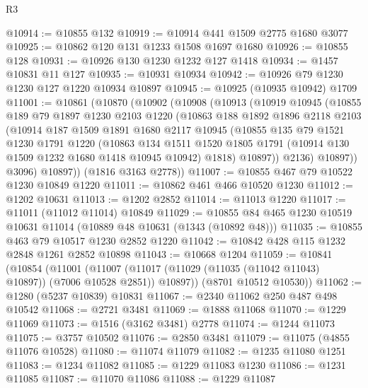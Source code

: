 \begin{lexlean}{R3}
\begin{coremodule}
@10914 := @10855 @132
@10919 := @10914 @441 @1509 @2775 @1680 @3077
@10925 := @10862 @120 @131 @1233 @1508 @1697 @1680
@10926 := @10855 @128
@10931 := @10926 @130 @1230 @1232 @127 @1418
@10934 := @1457 @10831 @11 @127
@10935 := @10931 @10934
@10942 := @10926 @79 @1230 @1230 @127 @1220 @10934 @10897
@10945 := @10925 (@10935 @10942) @1709
@11001 := @10861
    (@10870
      (@10902
        (@10908
          (@10913
            (@10919
              @10945
              (@10855
                @189
                @79
                @1897
                @1230
                @2103
                @1220
                (@10863
                  @188
                  @1892
                  @1896
                  @2118
                  @2103
                  (@10914
                    @187
                    @1509
                    @1891
                    @1680
                    @2117
                    @10945
                    (@10855
                      @135
                      @79
                      @1521
                      @1230
                      @1791
                      @1220
                      (@10863
                        @134
                        @1511
                        @1520
                        @1805
                        @1791
                        (@10914 @130 @1509 @1232 @1680 @1418 @10945 @10942)
                        @1818)
                      @10897))
                  @2136)
                @10897))
            @3096)
          @10897))
      (@1816 @3163 @2778))
@11007 := @10855 @467 @79 @10522 @1230 @10849 @1220
@11011 := @10862 @461 @466 @10520 @1230
@11012 := @1202 @10631
@11013 := @1202 @2852
@11014 := @11013 @1220
@11017 := @11011 (@11012 @11014) @10849
@11029 := @10855 @84 @465 @1230 @10519 @10631 @11014 (@10889 @48 @10631 (@1343 (@10892 @48)))
@11035 := @10855 @463 @79 @10517 @1230 @2852 @1220
@11042 := @10842 @428 @115 @1232 @2848 @1261 @2852 @10898
@11043 := @10668 @1204
@11059 := @10841
    (@10854
      (@11001
        (@11007 (@11017 (@11029 (@11035 (@11042 @11043) @10897)) (@7006 @10528 @2851)) @10897))
      (@8701 @10512 @10530))
@11062 := @1280 (@5237 @10839) @10831
@11067 := @2340 @11062 @250 @487 @498 @10542
@11068 := @2721 @3481
@11069 := @1888 @11068
@11070 := @1229 @11069
@11073 := @1516 (@3162 @3481) @2778
@11074 := @1244 @11073
@11075 := @3757 @10502
@11076 := @2850 @3481
@11079 := @11075 (@4855 @11076 @10528)
@11080 := @11074 @11079
@11082 := @1235 @11080 @1251
@11083 := @1234 @11082
@11085 := @1229 @11083 @1230
@11086 := @1231 @11085
@11087 := @11070 @11086
@11088 := @1229 @11087

\end{coremodule}
\end{lexlean}
